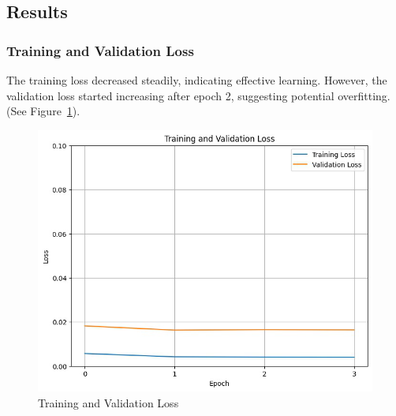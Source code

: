    \subsection{Results}

        \subsubsection{Training and Validation Loss \\}

            The training loss decreased steadily, indicating effective learning. However, the validation loss started increasing after epoch 2, suggesting potential overfitting. (See Figure~\ref{fig:loss}).
            
            \begin{figure}[h]
                \centering
                \begin{minipage}[c]{0.47\textwidth}
                    \centering
                    \includegraphics[width=\textwidth]{../figures/plots/section4/loss_curves.png}
                    \caption{Training and Validation Loss}
                    \label{fig:loss}
                \end{minipage}
                \hfill
                \begin{minipage}[c]{0.47\textwidth}
                    \centering

\end{minipage}
\end{figure}
